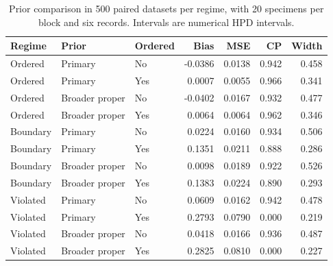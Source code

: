 \begin{table}[htbp]
\centering
\caption{Prior comparison in 500 paired datasets per regime, with 20 specimens per block and six records. Intervals are numerical HPD intervals.}\label{tab:prior-extensions}
\small
\begin{tabular}{lllrrrr}
\toprule
Regime & Prior & Ordered & Bias & MSE & CP & Width \\
\midrule
Ordered & Primary & No & -0.0386 & 0.0138 & 0.942 & 0.458 \\
Ordered & Primary & Yes & 0.0007 & 0.0055 & 0.966 & 0.341 \\
Ordered & Broader proper & No & -0.0402 & 0.0167 & 0.932 & 0.477 \\
Ordered & Broader proper & Yes & 0.0064 & 0.0064 & 0.962 & 0.346 \\
Boundary & Primary & No & 0.0224 & 0.0160 & 0.934 & 0.506 \\
Boundary & Primary & Yes & 0.1351 & 0.0211 & 0.888 & 0.286 \\
Boundary & Broader proper & No & 0.0098 & 0.0189 & 0.922 & 0.526 \\
Boundary & Broader proper & Yes & 0.1383 & 0.0224 & 0.890 & 0.293 \\
Violated & Primary & No & 0.0609 & 0.0162 & 0.942 & 0.478 \\
Violated & Primary & Yes & 0.2793 & 0.0790 & 0.000 & 0.219 \\
Violated & Broader proper & No & 0.0418 & 0.0166 & 0.936 & 0.487 \\
Violated & Broader proper & Yes & 0.2825 & 0.0810 & 0.000 & 0.227 \\
\bottomrule
\end{tabular}
\end{table}
